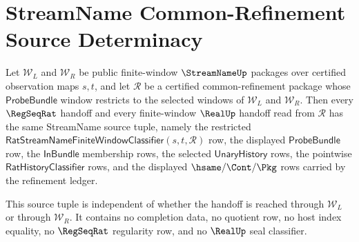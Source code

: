 \section{StreamName Common-Refinement Source Determinacy}
\label{sec:streamname-common-refinement-source-determinacy}

\begin{theorem}
\label{thm:streamname-common-refinement-source-determinacy}
Let $\mathcal W_L$ and $\mathcal W_R$ be public finite-window
$\StreamNameUp$ packages over certified observation maps $s,t$, and let
$\mathcal R$ be a certified common-refinement package whose
$\mathsf{ProbeBundle}$ window restricts to the selected windows of
$\mathcal W_L$ and $\mathcal W_R$. Then every $\RegSeqRat$ handoff and every
finite-window $\RealUp$ handoff read from $\mathcal R$ has the same
StreamName source tuple, namely the restricted
$\mathsf{RatStreamNameFiniteWindowClassifier}(s,t,\mathcal R)$ row, the
displayed $\mathsf{ProbeBundle}$ row, the $\mathsf{InBundle}$ membership rows,
the selected $\mathsf{UnaryHistory}$ rows, the pointwise
$\mathsf{RatHistoryClassifier}$ rows, and the displayed
$\hsame/\Cont/\Pkg$ rows carried by the refinement ledger.

This source tuple is independent of whether the handoff is reached through
$\mathcal W_L$ or through $\mathcal W_R$. It contains no completion data, no
quotient row, no host index equality, no $\RegSeqRat$ regularity row, and no
$\RealUp$ seal classifier.
\end{theorem}
